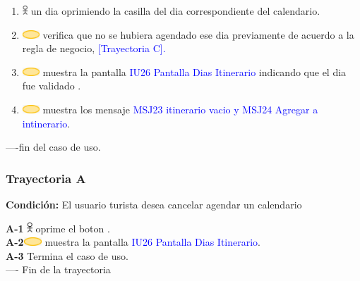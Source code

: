 \begin{enumerate}
\item \includegraphics[width=0.0150\textwidth]{Figuras/persona.png} un dia oprimiendo la casilla  del dia correspondiente del calendario.

\item \includegraphics[width=0.0500\textwidth]{Figuras/sistema.png} verifica que no se hubiera agendado ese dia previamente de acuerdo a la regla de negocio, \textcolor{blue}{[Trayectoria C].}

\item \includegraphics[width=0.0500\textwidth]{Figuras/sistema.png} muestra la pantalla \textcolor{blue}{IU26 Pantalla Dias Itinerario} indicando que el dia fue validado .

\item \includegraphics[width=0.0500\textwidth]{Figuras/sistema.png} muestra los mensaje \textcolor{blue}{MSJ23 itinerario vacio y MSJ24 Agregar a intinerario}.

\end{enumerate}
----fin del caso de uso. \\

\subsubsection{\textbf{Trayectoria A}}

\textbf{Condición:} El usuario turista desea cancelar agendar un calendario \par

     \textbf{A-1} \includegraphics[width=0.0150\textwidth]{Figuras/persona.png} oprime el boton . \\
    \textbf{A-2}\includegraphics[width=0.0500\textwidth]{Figuras/sistema.png} muestra la pantalla \textcolor{blue}{IU26 Pantalla Dias Itinerario}. \\
   \textbf{A-3} Termina el caso de uso. \\
   ---- Fin de la trayectoria\par


